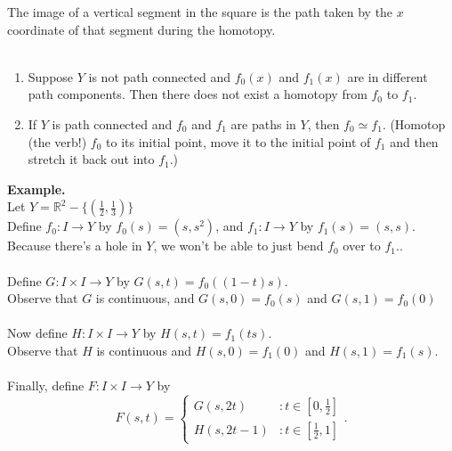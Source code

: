 \documentclass[10pt,reqno]{amsart}
\begin{document}
\noindent The image of a vertical segment in the square is the path taken  by the $x$ coordinate of that segment during the homotopy.\\\\
\begin{enumerate}
\item Suppose $Y$ is not path connected and $f_0(x)$  and $f_1(x)$ are in different path components. Then there does not exist a homotopy from $f_0$ to $f_1$.\\
\vspace{1in}
\item If $Y$ is path connected and $f_0$ and $f_1$ are paths in $Y$, then $f_0 \simeq f_1$. (Homotop (the verb!) $f_0$ to its initial point, move it to the initial point of $f_1$ and then stretch it back out into $f_1$.)
\vspace{1in}
\end{enumerate}
{\bf Example.}\\
Let $Y = \mathbb{R}^2 - \{(\frac{1}{2}, \frac{1}{3})\}$\\
Define $f_0: I \rightarrow Y$ by $f_0(s) = (s,s^2)$, and $f_1: I \rightarrow Y$ by $f_1(s) = (s,s).$\\
Because there's a hole in $Y$, we won't be able to just bend $f_0$ over to $f_1$..\\\\
Define $G: I \times I \rightarrow Y$  by $G(s,t) = f_0((1-t)s)$.\\
Observe that $G$ is continuous, and $G(s,0) = f_0(s)$ and $G(s,1) = f_0(0)$\\\\
Now define $H: I \times I \rightarrow Y$ by $H(s,t) = f_1(ts)$.\\
Observe that $H$ is continuous and $H(s,0) = f_1(0)$ and $H(s,1) = f_1(s)$.\\\\
Finally, define $F: I \times I \rightarrow Y$ by
\begin{displaymath}
   F(s, t) = \left\{
     \begin{array}{lr}
       G(s, 2t) & : t \in [0, \frac{1}{2}]\\
       H(s, 2t-1) & : t \in [\frac{1}{2}, 1]
     \end{array}
   \right. .
\end{displaymath}
\vspace{.9in}
\end{document}
